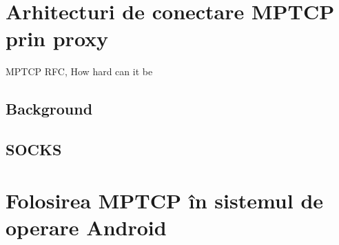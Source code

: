 \chapter{Arhitecturi de conectare  MPTCP prin proxy}
\label{sec:arch_upb}

MPTCP RFC\cite{rfc6824bis}, How hard can it be \cite{mptcp-nsdi}

\section{Background}
\section{SOCKS}


\chapter{Folosirea MPTCP în sistemul de operare Android}
\label{sec:mptcp_android}


